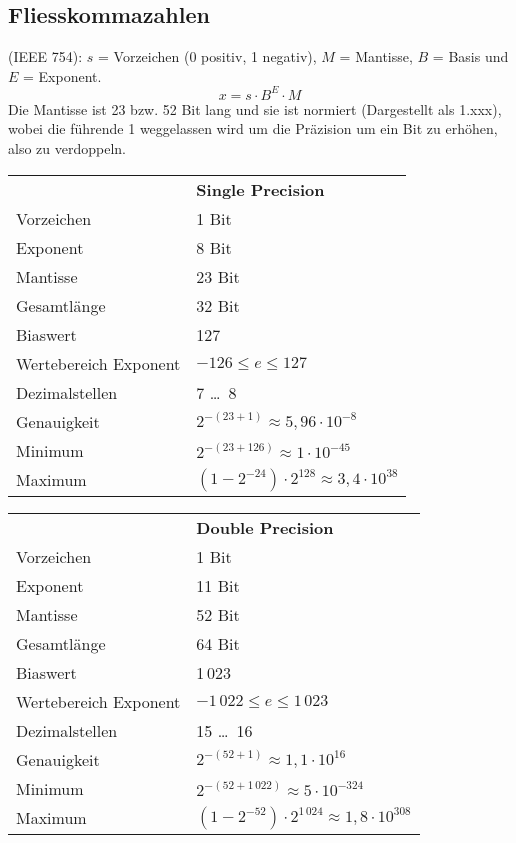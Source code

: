 \subsection{Fliesskommazahlen}
(IEEE 754): $s$ = Vorzeichen (0 positiv, 1 negativ), $M$ = Mantisse, $B$ = Basis und $E$ = Exponent.
\begin{equation*}
x = s  \cdot B^E \cdot M
\end{equation*}
Die Mantisse ist 23 bzw. 52 Bit lang und sie ist normiert (Dargestellt als 1.xxx), wobei die führende 1 weggelassen wird 
um die Präzision um ein Bit zu erhöhen, also zu verdoppeln.

	\begin{tabular}{ll}
							& \textbf{Single Precision}\\ 
	Vorzeichen				& 1 Bit\\
	Exponent				& 8 Bit\\
	Mantisse				& 23 Bit\\
	Gesamtlänge				& 32 Bit\\
	Biaswert				& 127\\
	Wertebereich Exponent 	& $-126 \leq e \leq 127$\\
	Dezimalstellen 			& 7 \dots\ 8\\
	Genauigkeit				& $2^{-(23 + 1)} \approx 5{,}96 \cdot 10^{-8}$\\
	Minimum					& $2^{-(23 + 126)} \approx 1 \cdot 10^{-45}$\\
	Maximum					& $(1 - 2^{-24}) \cdot 2^{128} \approx 3{,}4 \cdot 10^{38}$\\
	\end{tabular}
	\begin{tabular}{ll}
							& \textbf{Double Precision} \\
	Vorzeichen				& 1 Bit	\\
	Exponent				& 11 Bit\\	
	Mantisse				& 52 Bit\\
	Gesamtlänge				& 64 Bit\\
	Biaswert				& 1\,023\\
	Wertebereich Exponent	& $-1\,022 \leq e \leq 1\,023$\\
	Dezimalstellen			& 15 \dots\ 16\\
	Genauigkeit				& $2^{-(52 + 1)} \approx 1{,}1\cdot 10^{16}$\\
	Minimum					& $2^{-(52 + 1\,022)} \approx 5 \cdot 10^{-324}$\\
	Maximum					& $(1 - 2^{-52}) \cdot 2^{1\,024} \approx 1{,}8 \cdot 10^{308}$\\
	\end{tabular}

